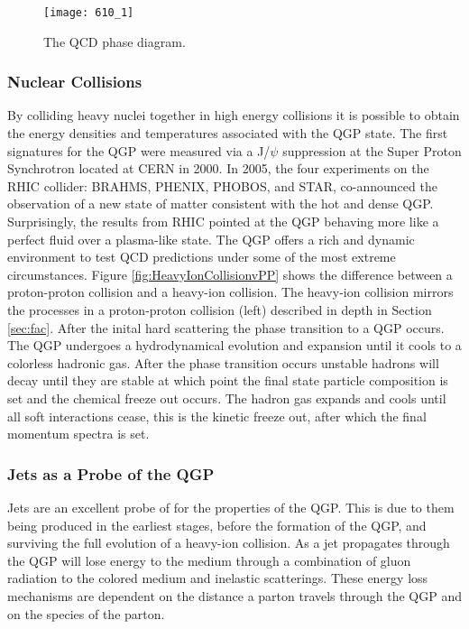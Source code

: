 \begin{figure}[h]
\texttt{[image: 610\_1]}
\centering
\caption{The QCD phase diagram\cite{Mohanty:2013yca}.}
\label{fig:QCDphase}
\end{figure}

\subsubsection{Nuclear Collisions}
By colliding heavy nuclei together in high energy collisions it is possible to obtain the energy densities and temperatures associated with the QGP state.  The first signatures for the QGP were measured via a J/$\psi$ suppression at the Super Proton Synchrotron located at CERN in 2000\cite{Csorgo:2000yu}.  In 2005, the four experiments on the RHIC collider: BRAHMS\cite{Arsene:2004fa}, PHENIX\cite{Adcox2005184}, PHOBOS\cite{Back200528}, and STAR\cite{Adams2005102}, co-announced the observation of a new state of matter consistent with the hot and dense QGP.  Surprisingly, the results from RHIC pointed at the QGP behaving more like a perfect fluid over a plasma-like state\cite{Jacak310}.  The QGP offers a rich and dynamic environment to test QCD predictions under some of the most extreme circumstances.  
Figure \ref{fig:HeavyIonCollisionvPP} shows the difference between a proton-proton collision and a heavy-ion collision.  The heavy-ion collision mirrors the processes in a proton-proton collision (left) described in depth in Section \ref{sec:fac}.  After the inital hard scattering the phase transition to a QGP occurs.  The QGP undergoes a hydrodynamical evolution and expansion until it cools to a colorless hadronic gas.  After the phase transition occurs unstable hadrons will decay until they are stable at which point the final state particle composition is set and the chemical freeze out occurs. The hadron gas expands and cools until all soft interactions cease, this is the kinetic freeze out, after which the final momentum spectra is set.  

\subsubsection{Jets as a Probe of the QGP}

Jets are an excellent probe of for the properties of the QGP.  This is due to them being produced in the earliest stages, before the formation of the QGP, and surviving the full evolution of a heavy-ion collision.  As a jet propagates through the QGP will lose energy to the medium through a combination of gluon radiation to the colored medium and inelastic scatterings.  These energy loss mechanisms are dependent on the distance a parton travels through the QGP and on the species of the parton.  

